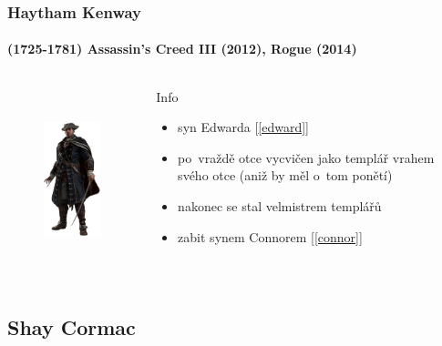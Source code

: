 \documentclass[hyperref={colorlinks, linkcolor=white, urlcolor=green!50!black}]{beamer}
\begin{document}
\begin{frame}\label{haytham}
\frametitle{Haytham Kenway}
\framesubtitle{(1725-1781) \hfill Assassin's Creed III (2012), Rogue (2014)}
\begin{columns}[c]

	\begin{figure}[h]
		\centering
		\includegraphics[height=200px]{char_haytham}
	\end{figure}
	
	\begin{block}{Info}
		\begin{itemize}
			\item syn Edwarda [\ref{edward}]
			\item po~vraždě otce vycvičen jako templář vrahem svého otce (aniž by měl o~tom ponětí)
			\item nakonec se stal velmistrem templářů
			\item zabit synem Connorem [\ref{connor}]
		\end{itemize}
	\end{block}

\end{columns}
\end{frame}

\subsection[Shay]{Shay Cormac}
\end{document}
